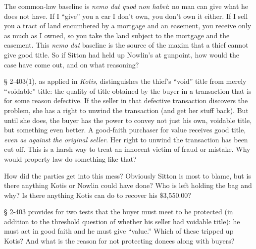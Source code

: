 
\item The common-law baseline is \textit{nemo dat quod non habet}: no man can
give what he does not have. If I ``give'' you a car I don't own, you don't own
it either. If I sell you a tract of land encumbered by a mortgage and an
easement, you receive only as much as I owned, so you take the land subject to
the mortgage and the easement. This \textit{nemo dat} baseline is the source of
the maxim that a thief cannot give good title. So if Sitton had held up
Nowlin's at gunpoint, how would the case have come out, and on what reasoning?

{\S} 2-403(1), as applied in \textit{Kotis}, distinguishes the thief's ``void''
title from merely ``voidable'' title: the quality of title obtained by the
buyer in a transaction that is for some reason defective. If the seller in that
defective transaction discovers the problem, she has a right to unwind the
transaction (and get her stuff back). But until she does, the buyer has the
power to convey not just his own, voidable title, but something even better. A
good-faith purchaser for value receives good title, \textit{even as against the
original seller}. Her right to unwind the transaction has been cut off. This is
a harsh way to treat an innocent victim of fraud or mistake. Why would property
law do something like that?


\item How did the parties get into this mess? Obviously Sitton is most to blame,
but is there anything Kotis or Nowlin could have done? Who is left holding the
bag and why? Is there anything Kotis can do to recover his \$3,550.00?


\item {\S} 2-403 provides for two tests that the buyer must meet to be protected
(in addition to the threshold question of whether his seller had voidable
title): he must act in good faith and he must give ``value.'' Which of these
tripped up Kotis? And what is the reason for not protecting donees along with
buyers? 

